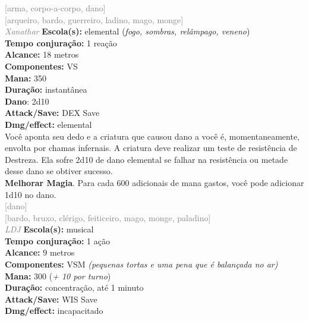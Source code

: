 \documentclass{RPG_Adventure}[2021/10/20]
\begin{document}
{\scriptsize \textcolor{gray}{[arma, corpo-a-corpo, dano]\\}}
{\scriptsize \textcolor{gray}{[arqueiro, bardo, guerreiro, ladino, mago, monge]\\}}
{\tiny \textcolor{gray}{\textit{Xanathar}}}
{\small \t \textbf{Escola(s):} elemental (\textit{fogo, sombras, relâmpago, veneno})\\\t \textbf{Tempo conjuração:} 1 reação\\\t \textbf{Alcance:} 18 metros\\\t \textbf{Componentes:} VS\\\t \textbf{Mana:} 350\\\t \textbf{Duração:} instantânea\\\t \textbf{Dano}: 2d10\\\t \textbf{Attack/Save:} DEX Save\\\t \textbf{Dmg/effect:} elemental\\}
{\normalsize Você aponta seu dedo e a criatura que causou dano a você é, momentaneamente, envolta por chamas infernais. A criatura deve realizar um teste de resistência de Destreza. Ela sofre 2d10 de dano elemental se falhar na resistência ou metade desse dano se obtiver sucesso.\\\t \textbf{Melhorar Magia}. Para cada 600 adicionais de mana gastos, você pode adicionar 1d10 no dano.\\}
{\scriptsize \textcolor{gray}{[dano]\\}}
{\scriptsize \textcolor{gray}{[bardo, bruxo, clérigo, feiticeiro, mago, monge, paladino]\\}}
{\tiny \textcolor{gray}{\textit{LDJ}}}
{\small \t \textbf{Escola(s):} musical\\\t \textbf{Tempo conjuração:} 1 ação\\\t \textbf{Alcance:} 9 metros\\\t \textbf{Componentes:} VSM \textit{(pequenas tortas e uma pena que é balançada no ar)}\\\t \textbf{Mana:} 300 (\textit{+ 10 por turno})\\\t \textbf{Duração:} concentração, até 1 minuto\\\t \textbf{Attack/Save:} WIS Save\\\t \textbf{Dmg/effect:} incapacitado\\}
\end{document}
